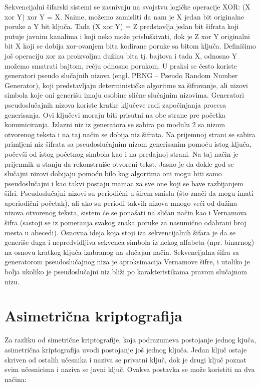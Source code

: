\documentclass[a4paper]{article}
\begin{document}
Sekvencijalni šifarski sistemi se zasnivaju na svojstvu logičke operacije XOR: (X xor Y) xor Y = X. Naime, možemo zamisliti da nam je X jedan bit originalne poruke a Y bit ključa. Tada (X xor Y) = Z predstavlja jedan bit šifrata koji putuje javnim kanalima i koji neko može prisluškivati, dok je Z xor Y originalni bit X koji se dobija xor-ovanjem bita kodirane poruke sa bitom ključa. Definišimo još operaciju xor za proizvoljnu dužinu bita tj. bajtova i tada X, odnosno Y možemo smatrati bajtom, rečju odnosno porukom. U praksi se često koriste generatori pseudo slučajnih nizova (engl. PRNG – Pseudo Random Number Generator), koji predstavljaju determinističke algoritme za šifrovanje, ali nizovi simbola koje oni generišu imaju osobine slične slučajnim nizovima. Generatori pseudoslučajnih nizova koriste kratke ključeve radi započinjanja procesa generisanja. Ovi ključevi moraju biti prisutni na obe strane pre početka komuniciranja. Izlazni niz iz generatora se sabira po modulu 2 sa nizom otvorenog teksta i na taj način se dobija niz šifrata. Na prijemnoj strani se sabira primljeni niz šifrata sa pseudoslučajnim nizom generisanim pomoću istog ključa, počevši od istog početnog simbola kao i na predajnoj strani. Na taj način je prijemnik u stanju da rekonstruiše otvoreni tekst. Jasno je da dokle god se slučajni nizovi dobijaju pomoću bilo kog algoritma oni mogu biti samo pseudoslučajni i kao takvi postaju mamac za sve one koji se bave razbijanjem šifri. Pseudoslučajni nizovi su periodični u širem smislu (što znači da mogu imati aperiodični početak), ali ako su periodi takvih nizova mnogo veći od dužina nizova otvorenog teksta, sistem će se ponašati na sličan način kao i Vernamova šifra (sastoji se iz pomeranja svakog znaka poruke za nasumično odabrani broj mesta u abecedi). Osnovna ideja koja stoji iza sekvencijalnih šifara je da se generiše duga i nepredvidljiva sekvenca simbola iz nekog alfabeta (npr. binarnog) na osnovu kratkog ključa izabranog na slučajan način. Sekvencijalna šifra sa generatorom pseudoslučajnog niza je aproksimacija Vernamove šifre, i utoliko je bolja ukoliko je pseudoslučajni niz bliži po karakteristikama pravom slučajnom nizu.

\section{Asimetrična kriptografija}
\label{sec:asimetricčna_kriptografija}
Za razliku od simetrične kriptografije, koja podrazumeva postojanje jednog kjuča, asimetrična kriptografija uvodi postojanje još jednog ključa. Jedan ključ ostaje skriven od
ostalih učesnika i naziva se privatni ključ, dok je drugi ključ poznat svim učesnicima i naziva se javni ključ. Ovakva postavka se može koristiti na dva načina:
\end{document}
